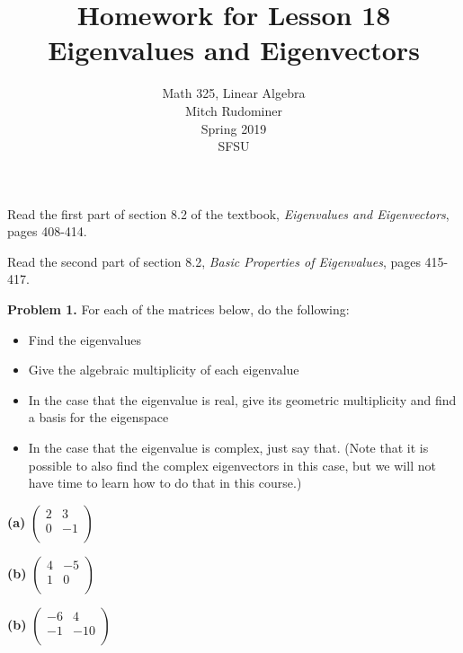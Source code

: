 \documentclass[oneside,12pt]{amsart}
\begin{document}
\title{Homework for Lesson 18 \\ Eigenvalues and Eigenvectors}
\author{Math 325, Linear Algebra \\ Mitch Rudominer \\ Spring 2019 \\ SFSU }
\date{}

\maketitle

\bigskip

Read the first part of section 8.2 of the textbook,
 \emph{Eigenvalues and Eigenvectors}, pages 408-414.

 Read the second part of section 8.2, \emph{Basic Properties of Eigenvalues},
 pages 415-417.

\bigskip

\textbf{Problem 1.} For each of the matrices below, do the following:
\begin{itemize}
\item Find the eigenvalues
\item Give the algebraic multiplicity of each eigenvalue
\item In the case that the eigenvalue is real, give its geometric multiplicity
and find a basis for the eigenspace
\item In the case that the eigenvalue is complex, just say that. (Note
that it is possible to also find the complex eigenvectors in this case, but
we will not have time to learn how to do that in this course.)
\end{itemize}

\bigskip

\textbf{(a)}
$
\begin{pmatrix}
2 & 3 \\
0 & -1 \\
\end{pmatrix}
$

\bigskip
\bigskip
\bigskip

\textbf{(b)}
$
\begin{pmatrix}
4 & -5 \\
1 & 0 \\
\end{pmatrix}
$


\bigskip
\bigskip
\bigskip

\textbf{(b)}
$
\begin{pmatrix}
-6 & 4 \\
-1 & -10 \\
\end{pmatrix}
$
\end{document}
